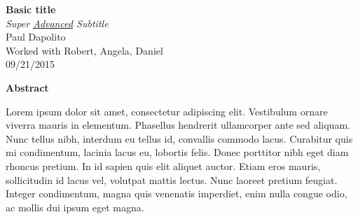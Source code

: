 \documentclass[letterpaper, boxed]{hmcpset}
\begin{document}
    \begin{center}
        \Large{\textbf{Basic title}} \\ 
        \textit{Super \underline{Advanced} Subtitle} \\
        \large{Paul Dapolito} \\
        \large{Worked with Robert, Angela, Daniel} \\
        \large{09/21/2015}
    \end{center}

    \large \begin{flushleft}
    \textbf{Abstract}
    \end{flushleft}
    \normalsize
        Lorem ipsum dolor sit amet, consectetur adipiscing elit. Vestibulum ornare viverra mauris in elementum. Phasellus hendrerit ullamcorper ante sed aliquam. Nunc tellus nibh, interdum eu tellus id, convallis commodo lacus. Curabitur quis mi condimentum, lacinia lacus eu, lobortis felis. Donec porttitor nibh eget diam rhoncus pretium. In id sapien quis elit aliquet auctor. Etiam eros mauris, sollicitudin id lacus vel, volutpat mattis lectus. Nunc laoreet pretium feugiat. Integer condimentum, magna quis venenatis imperdiet, enim nulla congue odio, ac mollis dui ipsum eget magna.
\end{document}

